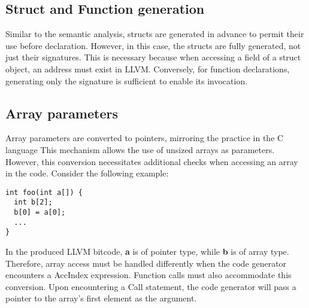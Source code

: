 \documentclass{article}
\begin{document}
\subsection*{Struct and Function generation}
Similar to the semantic analysis, structs are generated in advance to
permit their use before declaration. However, in this case, the structs
are fully generated, not just their signatures.
This is necessary because when accessing a field of a struct object,
an address must exist in LLVM. Conversely, for function declarations,
generating only the signature is sufficient to enable its invocation.

\subsection*{Array parameters}
Array parameters are converted to pointers, mirroring the practice in the C language
This mechanism allows the use of unsized arrays as parameters.
However, this conversion necessitates additional checks when accessing an array in the code.
Consider the following example:
\begin{lstlisting}[basicstyle=\ttfamily\fontsize{8pt}{14pt}, keywordstyle=\color{blue}, commentstyle=\color{green}]
int foo(int a[]) {
  int b[2];
  b[0] = a[0];
  ...
}
\end{lstlisting}
In the produced LLVM bitcode, \textbf{a} is of pointer type, while \textbf{b} is of array type. Therefore, array access must be handled differently when
the code generator encounters a AccIndex expression.
Function calls must also accommodate this conversion. Upon encountering a Call statement,
the code generator will pass a pointer to the array's first element as the argument.
\end{document}
